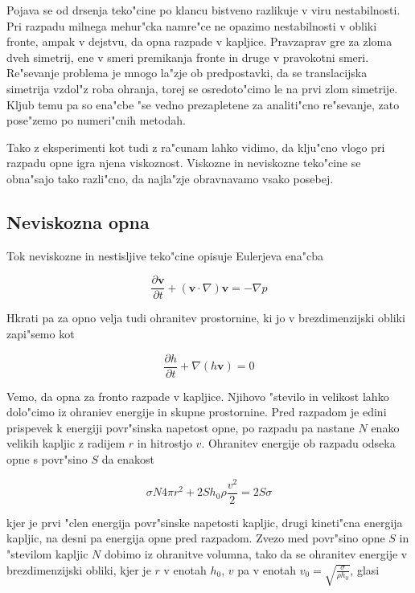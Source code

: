 \documentclass[a4paper,10pt]{article}
\renewcommand{\vec}{\mathbf}
\newcommand{\odv}[1]{\frac{\partial #1}{\partial t}}
\begin{document}
Pojava se od drsenja teko"cine po klancu bistveno razlikuje v viru nestabilnosti. Pri razpadu milnega mehur"cka namre"ce ne opazimo nestabilnosti v obliki fronte, ampak v dejstvu, da opna razpade v kapljice. Pravzaprav gre za zloma dveh simetrij, ene v smeri premikanja fronte in druge v pravokotni smeri. Re"sevanje problema je mnogo la"zje ob predpostavki, da se translacijska simetrija vzdol"z roba ohranja, torej se osredoto"cimo le na prvi zlom simetrije. Kljub temu pa so ena"cbe "se vedno prezapletene za analiti"cno re"sevanje, zato pose"zemo po numeri"cnih metodah. 

Tako z eksperimenti kot tudi z ra"cunam lahko vidimo, da klju"cno vlogo pri razpadu opne igra njena viskoznost. Viskozne in neviskozne teko"cine se obna"sajo tako razli"cno, da najla"zje obravnavamo vsako posebej. 

\subsection{Neviskozna opna}


Tok neviskozne in nestisljive teko"cine opisuje Eulerjeva ena"cba

\begin{equation}
\label{eq:meh-euler}
 \odv{\vec v} + (\vec v \cdot \nabla)\vec v = - \nabla p
\end{equation}

Hkrati pa za opno velja tudi ohranitev prostornine, ki jo v brezdimenzijski obliki zapi"semo kot

\begin{equation}
\label{eq:meh-ohranitev}
 \odv{h} + \nabla (h\vec v) = 0
\end{equation}

Vemo, da opna za fronto razpade v kapljice. Njihovo "stevilo in velikost lahko dolo"cimo iz ohraniev energije in skupne prostornine. Pred razpadom je edini prispevek k energiji povr"sinska napetost opne, po razpadu pa nastane $N$ enako velikih kapljic z radijem $r$ in hitrostjo $v$. Ohranitev energije ob razpadu odseka opne s povr"sino $S$ da enakost

\begin{equation}
 \sigma N 4 \pi r^2 + 2 S h_0 \rho \frac{v^2}{2} = 2S\sigma
\end{equation}

kjer je prvi "clen energija povr"sinske napetosti kapljic, drugi kineti"cna energija kapljic, na desni pa energija opne pred razpadom. Zvezo med povr"sino opne $S$ in "stevilom kapljic $N$ dobimo iz ohranitve volumna, tako da se ohranitev energije v brezdimenzijski obliki, kjer je $r$ v enotah $h_0$, $v$ pa v enotah $v_0 = \sqrt{\frac{\sigma}{\rho h_0}}$, glasi
\end{document}
